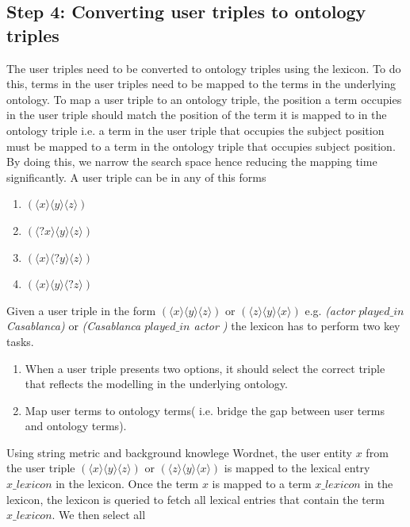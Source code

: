 \documentclass[review]{elsarticle}
\begin{document}
\subsection{Step 4: Converting user triples to ontology triples}
The user triples need to be converted to ontology triples using the lexicon. To do this, terms in the user triples need to be mapped to the terms in the underlying ontology. To map a user triple to an ontology triple, the position a term occupies in the user triple should match the position of the term it is mapped to in the ontology triple i.e. a term in the user triple that occupies the subject position must be mapped to a term in the ontology triple that occupies subject position. By doing this, we narrow the search space hence reducing the mapping time significantly.  A user triple can be in any of this forms
\begin{enumerate}
\item  $ (\langle x\rangle\langle y\rangle\langle z\rangle)$
\item  $ (\langle ?x\rangle\langle y\rangle\langle z\rangle)$
\item  $ (\langle x\rangle\langle ? y\rangle\langle z\rangle)$
\item  $ (\langle x\rangle\langle y\rangle\langle ?z\rangle)$
\end{enumerate}
Given a user triple in the form  $ (\langle x\rangle\langle y\rangle\langle z\rangle)$ or   $( \langle z\rangle\langle y\rangle\langle x\rangle) $
 e.g. \textit{(actor $played\_in$ Casablanca)} or \textit{(Casablanca $played\_in$ actor ) }   the lexicon has to perform two key tasks.
\begin{enumerate}
\item When a user triple presents two options, it should select the correct triple that reflects the modelling in the underlying ontology.
\item Map user terms to ontology terms( i.e. bridge the gap between user terms and ontology terms).
\end{enumerate}
Using string metric \citep{Stoilos2005} and background knowlege Wordnet, the user entity 
$ x$ from the user triple  $ (\langle x\rangle\langle y\rangle\langle z\rangle)$ or   $( \langle z\rangle\langle y\rangle\langle x\rangle) $ is mapped to the lexical entry $x\_lexicon$ in the lexicon. Once the term $ x$  is mapped to a term $x\_lexicon$ in the lexicon, the lexicon is queried  to fetch all lexical entries that contain the term $x\_lexicon$. We then select all 
\end{document}
